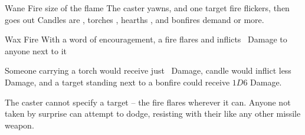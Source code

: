 \ifodd\value{diceNo}

  {}%
  {Wane}%
  {Fire}%
  {size of the flame}%
  {The caster yawns, and one target fire flickers, then goes out}%
  {Candles are \tn[6], torches \tn[7], hearths \tn[8], and bonfires demand \tn[9] or more.}

\else

  {}%
  {Wax}%
  {Fire}%
  {}%
  {With a word of encouragement, a fire flares and inflicts \showDam\ Damage to anyone next to it}%
  {

    Someone carrying a torch would receive just \showDam\ Damage, candle would inflict less Damage, and a target standing next to a bonfire could receive $1D6$ Damage.

    The caster cannot specify a target -- the fire flares wherever it can.
    Anyone not taken by surprise can attempt to dodge, resisting with their  like any other missile weapon.}

\fi
{}
